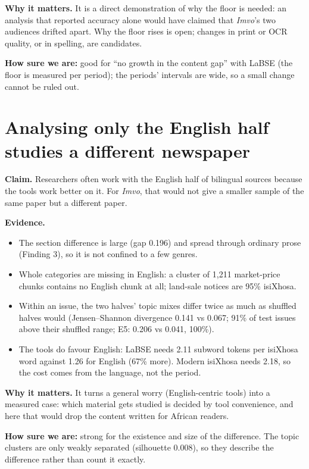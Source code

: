 \documentclass[11pt,a4paper]{article}
\newcommand{\strength}[1]{\par\noindent\textbf{How sure we are:} #1\par}
\newcommand{\claim}[1]{\par\smallskip\noindent\colorbox{black!6}{\parbox{\dimexpr\linewidth-2\fboxsep}{\textbf{Claim.} #1}}\par\smallskip}
\begin{document}
\textbf{Why it matters.} It is a direct demonstration of why the floor is needed: an analysis that
reported accuracy alone would have claimed that \emph{Imvo}'s two audiences drifted apart. Why the
floor rises is open; changes in print or OCR quality, or in spelling, are candidates.

\strength{good for ``no growth in the content gap'' with LaBSE (the floor is measured per period); the
periods' intervals are wide, so a small change cannot be ruled out.}

\section{Analysing only the English half studies a different newspaper}
\claim{Researchers often work with the English half of bilingual sources because the tools work better
on it. For \emph{Imvo}, that would not give a smaller sample of the same paper but a different paper.}

\textbf{Evidence.}
\begin{itemize}
  \item The section difference is large (gap 0.196) and spread through ordinary prose (Finding 3), so it is
  not confined to a few genres.
  \item Whole categories are missing in English: a cluster of 1{,}211 market-price chunks contains no
  English chunk at all; land-sale notices are 95\% isiXhosa.
  \item Within an issue, the two halves' topic mixes differ twice as much as shuffled halves would
  (Jensen--Shannon divergence 0.141 vs 0.067; 91\% of test issues above their shuffled range; E5: 0.206
  vs 0.041, 100\%).
  \item The tools do favour English: LaBSE needs 2.11 subword tokens per isiXhosa word against 1.26 for
  English (67\% more). Modern isiXhosa needs 2.18, so the cost comes from the language, not the period.
\end{itemize}

\textbf{Why it matters.} It turns a general worry (English-centric tools) into a measured case: which
material gets studied is decided by tool convenience, and here that would drop the content written for
African readers.

\strength{strong for the existence and size of the difference. The topic clusters are only weakly
separated (silhouette 0.008), so they describe the difference rather than count it exactly.}
\end{document}
